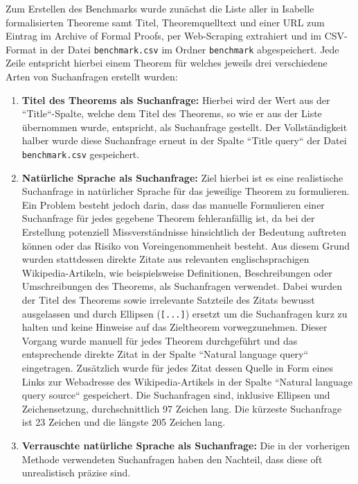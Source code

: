 \documentclass[12pt,letterpaper]{article} %
\begin{document}
Zum Erstellen des Benchmarks wurde zunächst die Liste aller in Isabelle formalisierten Theoreme samt Titel, Theoremquelltext und einer URL zum Eintrag im Archive of Formal Proofs, per Web-Scraping extrahiert und im CSV-Format in der Datei \texttt{benchmark.csv} im Ordner \texttt{benchmark} abgespeichert.
Jede Zeile entspricht hierbei einem Theorem für welches jeweils drei verschiedene Arten von Suchanfragen erstellt wurden:
\begin{enumerate}
  \item \textbf{Titel des Theorems als Suchanfrage:}
  Hierbei wird der Wert aus der ``Title``-Spalte, welche dem Titel des Theorems, so wie er aus der Liste übernommen wurde, entspricht, als Suchanfrage gestellt.
  Der Vollständigkeit halber wurde diese Suchanfrage erneut in der Spalte ``Title query`` der Datei \texttt{benchmark.csv} gespeichert.
  \item \textbf{Natürliche Sprache als Suchanfrage:}
  Ziel hierbei ist es eine realistische Suchanfrage in natürlicher Sprache für das jeweilige Theorem zu formulieren.
  Ein Problem besteht jedoch darin, dass das manuelle Formulieren einer Suchanfrage für jedes gegebene Theorem fehleranfällig ist, da bei der Erstellung potenziell Missverständnisse hinsichtlich der Bedeutung auftreten können oder das Risiko von Voreingenommenheit besteht.
  Aus diesem Grund wurden stattdessen direkte Zitate aus relevanten englischsprachigen Wikipedia-Artikeln, wie beispielsweise Definitionen, Beschreibungen oder Umschreibungen des Theorems, als Suchanfragen verwendet.
  Dabei wurden der Titel des Theorems sowie irrelevante Satzteile des Zitats bewusst ausgelassen und durch Ellipsen (\texttt{[...]}) ersetzt um die Suchanfragen kurz zu halten und keine Hinweise auf das Zieltheorem vorwegzunehmen.
  Dieser Vorgang wurde manuell für jedes Theorem durchgeführt und das entsprechende direkte Zitat in der Spalte ``Natural language query`` eingetragen.
  Zusätzlich wurde für jedes Zitat dessen Quelle in Form eines Links zur Webadresse des Wikipedia-Artikels in der Spalte ``Natural language query source`` gespeichert.
  Die Suchanfragen sind, inklusive Ellipsen und Zeichensetzung, durchschnittlich 97 Zeichen lang.
  Die kürzeste Suchanfrage ist 23 Zeichen und die längste 205 Zeichen lang.
  \item \textbf{Verrauschte natürliche Sprache als Suchanfrage:}
  Die in der vorherigen Methode verwendeten Suchanfragen haben den Nachteil, dass diese oft unrealistisch präzise sind.

\end{enumerate}
\end{document}

